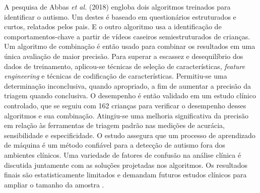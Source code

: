 \documentclass{template/sig-alternate-05-2015}
\begin{document}
A pesquisa de Abbas \textit{et al.} (2018) engloba dois algoritmos
treinados para identificar o autismo. Um destes é baseado em
questionários estruturados e curtos, relatados pelos pais. E o outro
algoritmo usa a identificação de comportamentos-chave a partir de
vídeos caseiros semiestruturados de crianças. Um algoritmo de
combinação é então usado para combinar os resultados em uma única
avaliação de maior precisão. Para superar a escassez e desequilíbrio
dos dados de treinamento, aplicou-se técnicas de seleção de
características, \textit{feature engineering} e técnicas de
codificação de características. Permitiu-se uma determinação
inconclusiva, quando apropriado, a fim de aumentar a precisão da
triagem quando conclusiva. O desempenho é então validado em um estudo
clínico controlado, que se seguiu com 162 crianças para verificar o
desempenho desses algoritmos e sua combinação. Atingiu-se uma melhoria
significativa da precisão em relação às ferramentas de triagem padrão
nas medições de acurácia, sensibilidade e especificidade. O estudo
assegura que um processo de aprendizado de máquina é um método
confiável para a detecção de autismo fora dos ambientes clínicos. Uma
variedade de fatores de confusão na análise clínica é discutida
juntamente com as soluções projetadas nos algoritmos. Os resultados
finais são estatisticamente limitados e demandam futuros estudos
clínicos para ampliar o tamanho da amostra \cite{Abbas:2018}.
\end{document}
